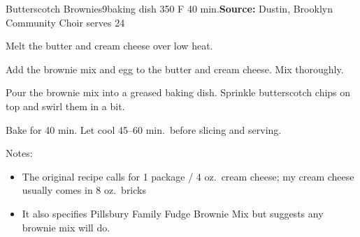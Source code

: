 \begin{recipe}{Butterscotch Brownies}{9\inch{}\inch baking dish \hfill 350\0 F \hfill 40 min.}{\textbf{Source:} Dustin, Brooklyn Community Choir \hfill serves 24}

 Melt the butter and cream cheese over low heat.

 Add the brownie mix and egg to the butter and cream cheese. Mix thoroughly.

 Pour the brownie mix into a greased baking dish. Sprinkle butterscotch chips on top and swirl them in a bit.

 \newstep Bake for 40 min. Let cool 45--60 min.\ before slicing and serving.

 \freeform Notes:
 \begin{itemize}
  \item The original recipe calls for 1 package / 4 oz.\ cream cheese; my cream cheese usually comes in 8 oz.\ bricks
  \item It also specifies Pillsbury Family Fudge Brownie Mix but suggests any brownie mix will do.
 \end{itemize}
\end{recipe}
